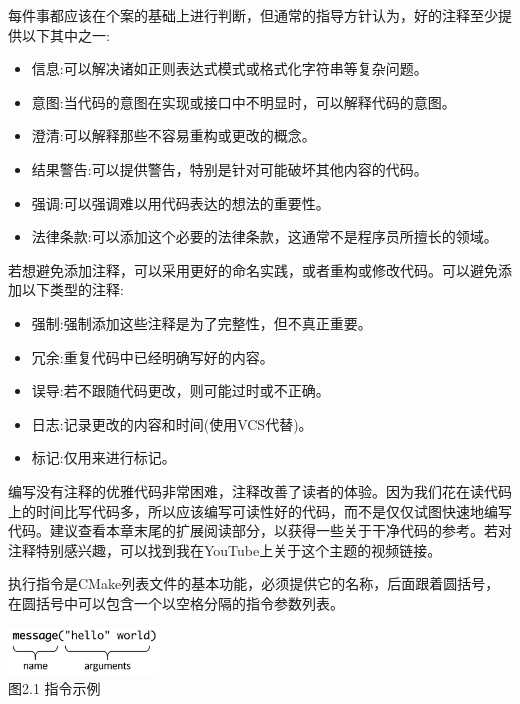 每件事都应该在个案的基础上进行判断，但通常的指导方针认为，好的注释至少提供以下其中之一:

\begin{itemize}
\item 
信息:可以解决诸如正则表达式模式或格式化字符串等复杂问题。

\item 
意图:当代码的意图在实现或接口中不明显时，可以解释代码的意图。

\item 
澄清:可以解释那些不容易重构或更改的概念。

\item 
结果警告:可以提供警告，特别是针对可能破坏其他内容的代码。

\item 
强调:可以强调难以用代码表达的想法的重要性。

\item 
法律条款:可以添加这个必要的法律条款，这通常不是程序员所擅长的领域。
\end{itemize}

若想避免添加注释，可以采用更好的命名实践，或者重构或修改代码。可以避免添加以下类型的注释:

\begin{itemize}
\item 
强制:强制添加这些注释是为了完整性，但不真正重要。

\item 
冗余:重复代码中已经明确写好的内容。

\item 
误导:若不跟随代码更改，则可能过时或不正确。

\item 
日志:记录更改的内容和时间(使用VCS代替)。

\item 
标记:仅用来进行标记。
\end{itemize}

编写没有注释的优雅代码非常困难，注释改善了读者的体验。因为我们花在读代码上的时间比写代码多，所以应该编写可读性好的代码，而不是仅仅试图快速地编写代码。建议查看本章末尾的扩展阅读部分，以获得一些关于干净代码的参考。若对注释特别感兴趣，可以找到我在YouTube上关于这个主题的视频链接。



执行指令是CMake列表文件的基本功能，必须提供它的名称，后面跟着圆括号，在圆括号中可以包含一个以空格分隔的指令参数列表。

\begin{center}
\includegraphics[width=0.3\textwidth]{content/1/chapter2/images/1.jpg}\\
图2.1 指令示例
\end{center}

